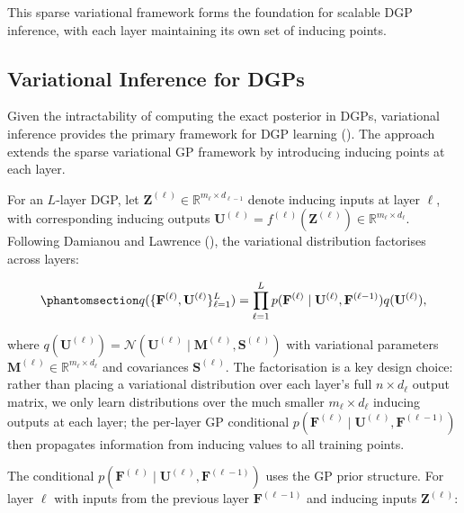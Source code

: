 \documentclass[
  letterpaper,
  DIV=11,
  numbers=noendperiod]{scrartcl}
\begin{document}
This sparse variational framework forms the foundation for scalable DGP
inference, with each layer maintaining its own set of inducing points.

\subsection{Variational Inference for
DGPs}\label{variational-inference-for-dgps}

Given the intractability of computing the exact posterior in DGPs,
variational inference provides the primary framework for DGP learning
(). The
approach extends the sparse variational GP framework by introducing
inducing points at each layer.

For an \(L\)-layer DGP, let
\(\mathbf{Z}^{(\ell)} \in \mathbb{R}^{m_\ell \times d_{\ell-1}}\) denote
inducing inputs at layer \(\ell\), with corresponding inducing outputs
\(\mathbf{U}^{(\ell)} = f^{(\ell)}(\mathbf{Z}^{(\ell)}) \in \mathbb{R}^{m_\ell \times d_\ell}\).
Following Damianou and Lawrence
(), the variational distribution
factorises across layers:

\begin{equation}\phantomsection\label{eq-dgp_variational_factorization}{
q(\{\mathbf{F}^{(\ell)}, \mathbf{U}^{(\ell)}\}_{\ell=1}^L) = \prod_{\ell=1}^{L} p(\mathbf{F}^{(\ell)} \mid \mathbf{U}^{(\ell)}, \mathbf{F}^{(\ell-1)}) q(\mathbf{U}^{(\ell)}),
}\end{equation}

where
\(q(\mathbf{U}^{(\ell)}) = \mathcal{N}(\mathbf{U}^{(\ell)} \mid \mathbf{M}^{(\ell)}, \mathbf{S}^{(\ell)})\)
with variational parameters
\(\mathbf{M}^{(\ell)} \in \mathbb{R}^{m_\ell \times d_\ell}\) and
covariances \(\mathbf{S}^{(\ell)}\). The factorisation is a key design
choice: rather than placing a variational distribution over each layer's
full \(n \times d_\ell\) output matrix, we only learn distributions over
the much smaller \(m_\ell \times d_\ell\) inducing outputs at each
layer; the per-layer GP conditional
\(p(\mathbf{F}^{(\ell)} \mid \mathbf{U}^{(\ell)}, \mathbf{F}^{(\ell-1)})\)
then propagates information from inducing values to all training points.

The conditional
\(p(\mathbf{F}^{(\ell)} \mid \mathbf{U}^{(\ell)}, \mathbf{F}^{(\ell-1)})\)
uses the GP prior structure. For layer \(\ell\) with inputs from the
previous layer \(\mathbf{F}^{(\ell-1)}\) and inducing inputs
\(\mathbf{Z}^{(\ell)}\):
\end{document}

